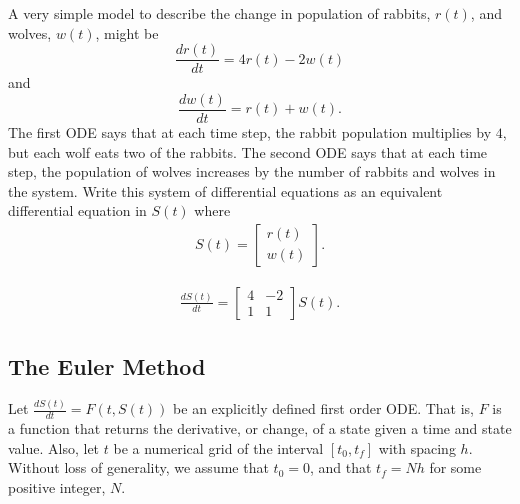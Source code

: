 \begin{myexercise}\label{Comprehensionquiz2}
A very simple model to describe the change in population of rabbits, $r(t)$, and wolves, $w(t)$, might be
\[\frac{dr(t)}{dt} = 4r(t) - 2w(t)\]
and
\[\frac{dw(t)}{dt} = r(t) + w(t).\]
The first ODE says that at each time step, the rabbit population multiplies by $4$, but each wolf eats two of the rabbits. The second ODE says that at each time step, the population of wolves increases by the number of rabbits and wolves in the system. Write this system of differential equations as an equivalent differential equation in $S(t)$ where
\[\begin{split}
S(t) =\left[\begin{array}{c}
r(t) \\
w(t)
\end{array}\right].
\end{split}\]

\begin{mysolution}
\[\begin{split}
\frac{dS(t)}{dt} = \left[\begin{array}{cc}
4 & -2 \\
1 & 1
\end{array}\right]S(t).
\end{split}\]
\end{mysolution}
\end{myexercise}

\subsection*{The Euler Method}
Let $\frac{dS(t)}{dt}=F(t,S(t))$ be an explicitly defined first order ODE. That is, $F$ is a function that returns the derivative, or change, of a state given a time and state value. Also, let $t$ be a numerical grid of the interval $[t_0,t_f]$ with spacing $h$. Without loss of generality, we assume that $t_0=0$, and that $t_f=Nh$ for some positive integer, $N$.

